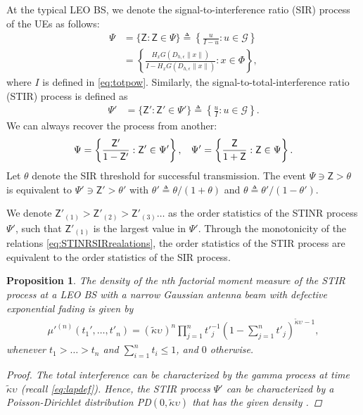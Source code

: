 \documentclass[lettersize,journal]{IEEEtran}
\newtheorem{prop}[theorem]{Proposition}
\begin{document}
 At the typical LEO BS, we denote the signal-to-interference ratio (SIR) process of the UEs as follows:
\begin{align}
  \label{eq:SINR}
  \Psi &= \{\mathsf{Z}: \mathsf{Z} \in \Psi\} \triangleq \left\{ \frac{u}{I-u} : u \in \mathcal{G}\right\} \nonumber \\
  &=\left\{ \frac{H_x G(D_{h,\epsilon}\|x\|)}{I-H_x G(D_{h,\epsilon}\|x\|)} : x \in \Phi\right\},
\end{align}
where $I$ is defined in \eqref{eq:totpow}. Similarly, the signal-to-total-interference ratio (STIR) process is defined as
\begin{align}
  \label{eq:STINR}
  \Psi' &= \{\mathsf{Z}': \mathsf{Z}' \in \Psi'\} \triangleq \left\{ \frac{u}{I} : u \in \mathcal{G}\right\}.
\end{align}
We can always recover the process from another:
\begin{equation}
  \label{eq:STINRSIRrealations}
  \Psi = \left\{ \frac{\mathsf{Z}'}{1- \mathsf{Z}'}: \mathsf{Z}' \in \Psi' \right\}, \hspace{0.3cm} \Psi' = \left\{ \frac{\mathsf{Z}}{1+ \mathsf{Z}}: \mathsf{Z} \in \Psi \right\}.
\end{equation}
Let $\theta$ denote the SIR threshold for successful transmission. The event $\Psi \ni\mathsf{Z}> \theta$ is equivalent to $\Psi' \ni \mathsf{Z}'> \theta'$  with $\theta' \triangleq \theta/(1+\theta)$ and $\theta \triangleq \theta'/(1-\theta')$. 
    
We denote $\mathsf{Z}'_{(1)}>\mathsf{Z}'_{(2)} >\mathsf{Z}'_{(3)} \dots$ as the order statistics of the STINR process $\Psi'$, such that $\mathsf{Z}'_{(1)}$ is the largest value in $\Psi'$. Through the monotonicity of the relations \eqref{eq:STINRSIRrealations}, the order statistics of the STIR process are equivalent to the order statistics of the SIR process.


\begin{prop}
  The density of the n\textit{th} factorial moment measure of the STIR process at a LEO BS with a narrow Gaussian antenna beam with defective exponential fading is given by
  \begin{align}
    \label{eq:factorialmoment}
    \mu'^{(n)}(t_1',\dots,t'_n) = (\tilde{\kappa}\upsilon_{})^n\prod_{j=1}^n{t'}_{j}^{-1}\left(1- \sum_{j=1}^nt'_j \right)^{\tilde{\kappa}\upsilon_{}-1},       
  \end{align}
  whenever $t_1>\dots >t_n$ and $\sum_{i=1}^n t_i \leq 1$, and $0$ otherwise.
  \begin{proof}
    The total interference can be characterized by the gamma process at time $\tilde{\kappa}\upsilon$ \cite[Eq. 8]{pitman1997two} (recall \eqref{eq:lapdef}). Hence, the STIR process $\Psi'$ can be characterized by a Poisson-Dirichlet distribution PD$(0,\tilde{\kappa}\upsilon)$ that has the given density \cite[Eq. 2.3]{handa2009two}.
  \end{proof}
\end{prop}
\end{document}
